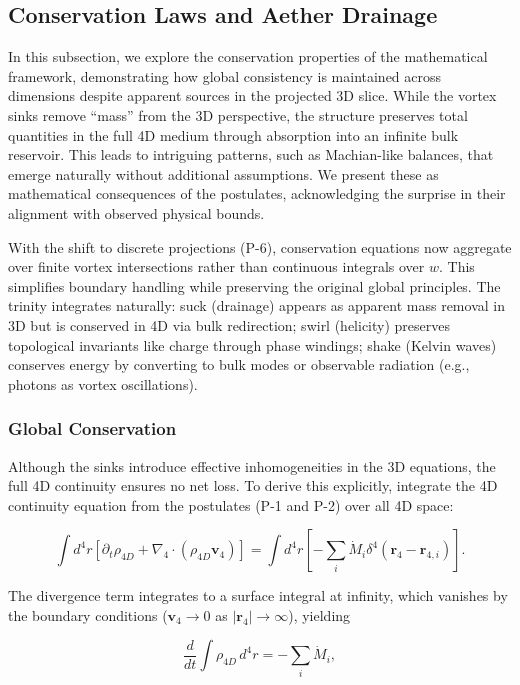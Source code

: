 \subsection{Conservation Laws and Aether Drainage}

In this subsection, we explore the conservation properties of the mathematical framework, demonstrating how global consistency is maintained across dimensions despite apparent sources in the projected 3D slice. While the vortex sinks remove ``mass'' from the 3D perspective, the structure preserves total quantities in the full 4D medium through absorption into an infinite bulk reservoir. This leads to intriguing patterns, such as Machian-like balances, that emerge naturally without additional assumptions. We present these as mathematical consequences of the postulates, acknowledging the surprise in their alignment with observed physical bounds.

With the shift to discrete projections (P-6), conservation equations now aggregate over finite vortex intersections rather than continuous integrals over $w$. This simplifies boundary handling while preserving the original global principles. The trinity integrates naturally: suck (drainage) appears as apparent mass removal in 3D but is conserved in 4D via bulk redirection; swirl (helicity) preserves topological invariants like charge through phase windings; shake (Kelvin waves) conserves energy by converting to bulk modes or observable radiation (e.g., photons as vortex oscillations).

\subsubsection{Global Conservation}
Although the sinks introduce effective inhomogeneities in the 3D equations, the full 4D continuity ensures no net loss. To derive this explicitly, integrate the 4D continuity equation from the postulates (P-1 and P-2) over all 4D space:

\begin{equation}
\int d^4 r \left[ \partial_t \rho_{4D} + \nabla_4 \cdot (\rho_{4D} \mathbf{v}_4) \right] = \int d^4 r \left[ -\sum_i \dot{M}_i \delta^4(\mathbf{r}_4 - \mathbf{r}_{4,i}) \right].
\end{equation}

The divergence term integrates to a surface integral at infinity, which vanishes by the boundary conditions ($\mathbf{v}_4 \to 0$ as $|\mathbf{r}_4| \to \infty$), yielding

\begin{equation}
\frac{d}{dt} \int \rho_{4D} \, d^4 r = -\sum_i \dot{M}_i,
\end{equation}

